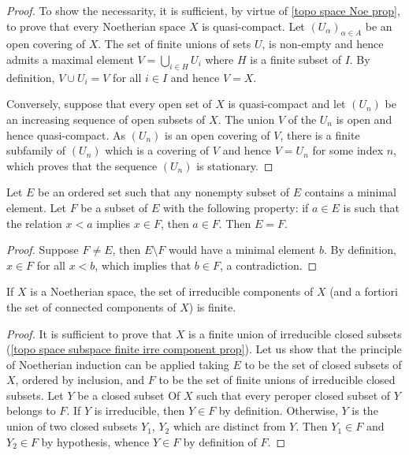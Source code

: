 \begin{proof}
To show the necessarity, it is sufficient, by virtue of \cref{topo space Noe prop}, to prove that every Noetherian space $X$ is quasi-compact. Let $(U_\alpha)_{\alpha\in A}$ be an open covering of $X$. The set of finite unions of sets $U$, is non-empty and hence admits a maximal element $V=\bigcup_{i\in H}U_i$ where $H$ is a finite subset of $I$. By definition, $V\cup U_i=V$ for all $i\in I$ and hence $V=X$.\par
Conversely, suppose that every open set of $X$ is quasi-compact and let $(U_n)$ be an increasing sequence of open subsets of $X$. The union $V$ of the $U_n$ is open and hence quasi-compact. As $(U_n)$ is an open covering of $V$, there is a finite subfamily of $(U_n)$ which is a covering of $V$ and hence $V=U_n$ for some index $n$, which proves that the sequence $(U_n)$ is stationary.
\end{proof}
\begin{lemma}\label{topo Noe induction principle}
Let $E$ be an ordered set such that any nonempty subset of $E$ contains a minimal element. Let $F$ be a subset of $E$ with the following property: if $a\in E$ is such that the relation $x<a$ implies $x\in F$, then $a\in F$. Then $E=F$.
\end{lemma}
\begin{proof}
Suppose $F\neq E$, then $E\setminus F$ would have a minimal element $b$. By definition, $x\in F$ for all $x<b$, which implies that $b\in F$, a contradiction.
\end{proof}
\begin{proposition}\label{topo space Noe finite irreducible componenet}
If $X$ is a Noetherian space, the set of irreducible components of $X$ (and a fortiori the set of connected components of $X$) is finite.
\end{proposition}
\begin{proof}
It is sufficient to prove that $X$ is a finite union of irreducible closed subsets (\cref{topo space subspace finite irre component prop}). Let us show that the principle of Noetherian induction can be applied taking $E$ to be the set of closed subsets of $X$, ordered by inclusion, and $F$ to be the set of finite unions of irreducible closed subsets. Let $Y$ be a closed subset Of $X$ such that every peroper closed subset of $Y$ belongs to $F$. If $Y$ is irreducible, then $Y\in F$ by definition. Otherwise, $Y$ is the union of two closed subsets $Y_1$, $Y_2$ which are distinct from $Y$. Then $Y_1\in F$ and $Y_2\in F$ by hypothesis, whence $Y\in F$ by definition of $F$.
\end{proof}
